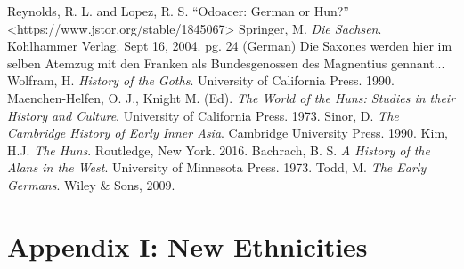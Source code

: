\documentclass{article}
\newcommand{\specificCite}[1]{\tiny #1 \normalsize}
\begin{document}
\begin{thebibliography}{99}
		Reynolds, R. L. and Lopez, R. S. “Odoacer: German or Hun?” <https://www.jstor.org/stable/1845067>
		Springer, M. \textit{Die Sachsen}. Kohlhammer Verlag. Sept 16, 2004. pg. 24 (German)
		\newline\specificCite{Die Saxones werden hier im selben Atemzug mit den Franken als Bundesgenossen des Magnentius gennant...}
		Wolfram, H. \textit{History of the Goths}. University of California Press. 1990.
		Maenchen-Helfen, O. J., Knight M. (Ed). \textit{The World of the Huns: Studies in their History and Culture}. University of California Press. 1973.
		Sinor, D. \textit{The Cambridge History of Early Inner Asia}. Cambridge University Press. 1990.
		Kim, H.J. \textit{The Huns}. Routledge, New York. 2016.
		Bachrach, B. S. \textit{A History of the Alans in the West}. University of Minnesota Press. 1973.
		Todd, M. \textit{The Early Germans}. Wiley \& Sons, 2009.
		
	\end{thebibliography}
	
	\newpage
	
	\section{Appendix I: New Ethnicities}
	\label{sec:appendix_new_ethnicities}
	
\end{document}
